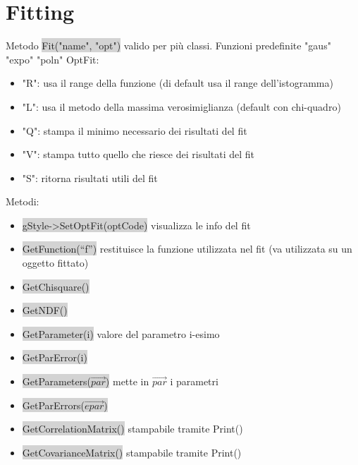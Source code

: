 \documentclass[a4paper]{article}
\begin{document}
\section{Fitting}
    Metodo \colorbox{LightGray}{Fit("name", "opt")} valido per più classi. Funzioni predefinite "gaus" "expo" "poln"
    OptFit:
    \begin{itemize}
        \item "R": usa il range della funzione (di default usa il range dell'istogramma)
        \item "L": usa il metodo della massima verosimiglianza (default con chi-quadro)
        \item "Q": stampa il minimo necessario dei risultati del fit
        \item "V": stampa tutto quello che riesce dei risultati del fit
        \item "S": ritorna risultati utili del fit
    \end{itemize}
    Metodi:
    \begin{itemize}
        \item \colorbox{LightGray}{gStyle->SetOptFit(optCode)} visualizza le info del fit
        \item \colorbox{LightGray}{GetFunction(“f”)} restituisce la funzione utilizzata nel fit (va utilizzata su un oggetto fittato)
        \item \colorbox{LightGray}{GetChisquare()}
        \item \colorbox{LightGray}{GetNDF()}
        \item \colorbox{LightGray}{GetParameter(i)} valore del parametro i-esimo
        \item \colorbox{LightGray}{GetParError(i)}
        \item \colorbox{LightGray}{GetParameters($\vec{par}$)} mette in $\vec{par}$ i parametri
        \item \colorbox{LightGray}{GetParErrors($\vec{epar}$)}
        \item \colorbox{LightGray}{GetCorrelationMatrix()} stampabile tramite Print()
        \item \colorbox{LightGray}{GetCovarianceMatrix()} stampabile tramite Print()
    \end{itemize}
\end{document}
